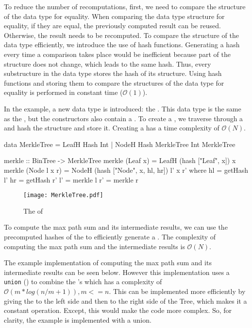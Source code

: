 To reduce the number of recomputations, first, we need to compare the structure of the data type for equality. When comparing the data type structure for equality, if they are equal, the previously computed result can be reused. Otherwise, the result needs to be recomputed. To compare the structure of the data type efficiently, we introduce the use of hash functions. Generating a hash every time a comparison takes place would be inefficient because part of the structure does not change, which leads to the same hash. Thus, every substructure in the data type stores the hash of its structure. Using hash functions and storing them to compare the structures of the data type for equality is performed in constant time ($\mathcal{O}(1)$).

In the example, a new data type is introduced: the . This data type is the same as the , but the constructors also contain a . To create a , we traverse through a  and hash the structure and store it. Creating a  has a time complexity of $\mathcal{O}(N)$.

\begin{haskell}
data MerkleTree = LeafH Hash Int
                | NodeH Hash MerkleTree Int MerkleTree

merkle :: BinTree -> MerkleTree
merkle (Leaf x)     = LeafH (hash ["Leaf", x]) x
merkle (Node l x r) = NodeH (hash ["Node", x, hl, hr]) l' x r'
  where
    hl = getHash l'
    hr = getHash r'
    l' = merkle l
    r' = merkle r
\end{haskell}

\begin{figure}[H]
    \centering
    \texttt{[image: MerkleTree.pdf]}
    \caption{The  of }
\end{figure}

To compute the max path sum and its intermediate results, we can use the precomputed hashes of the  to efficiently generate a . The complexity of computing the max path sum and the intermediate results is $\mathcal{O}(N)$.   

The example implementation of computing the max path sum and its intermediate results can be seen below. However this implementation uses a \texttt{union} (\inlinehaskell{<>}) to combine the 's which has a complexity of $\mathcal{O}(m*log(n/m + 1)), m <= n$\cite{HaskellDataUnion}. This can be implemented more efficiently by giving the  to the left side and then to the right side of the Tree, which makes it a constant operation. Except, this would make the code more complex. So, for clarity, the example is implemented with a union.

